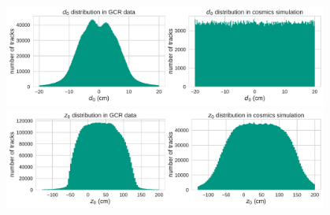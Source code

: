 \documentclass[18pt]{beamer}
\begin{document}
  \begin{frame}
    \begin{center}
      \includegraphics[width=0.8\textwidth]{figures/distributions/gcr_d0_distribution_uncut.pdf}\\
      \includegraphics[width=0.8\textwidth]{figures/distributions/gcr_z0_distribution_uncut.pdf}
    \end{center}
  \end{frame}
\end{document}
